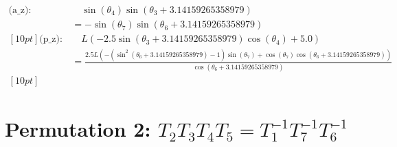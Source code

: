 \documentclass{article}
\begin{document}
\begin{align}
\text{(a_{z})}: & \quad \sin{\left(\theta_{4} \right)} \sin{\left(\theta_{3} + 3.14159265358979 \right)} \\ 
&= - \sin{\left(\theta_{7} \right)} \sin{\left(\theta_{6} + 3.14159265358979 \right)} \\ [10pt] 
\text{(p_{z})}: & \quad L \left(- 2.5 \sin{\left(\theta_{3} + 3.14159265358979 \right)} \cos{\left(\theta_{4} \right)} + 5.0\right) \\ 
&= \frac{2.5 L \left(- \left(\sin^{2}{\left(\theta_{6} + 3.14159265358979 \right)} - 1\right) \sin{\left(\theta_{7} \right)} + \cos{\left(\theta_{7} \right)} \cos{\left(\theta_{6} + 3.14159265358979 \right)}\right)}{\cos{\left(\theta_{6} + 3.14159265358979 \right)}} \\ [10pt] 
\end{align}

\newpage
\section{Permutation 2: $T_{2}T_{3}T_{4}T_{5} = T_{1}^{-1}T_{7}^{-1}T_{6}^{-1}$}
\end{document}
